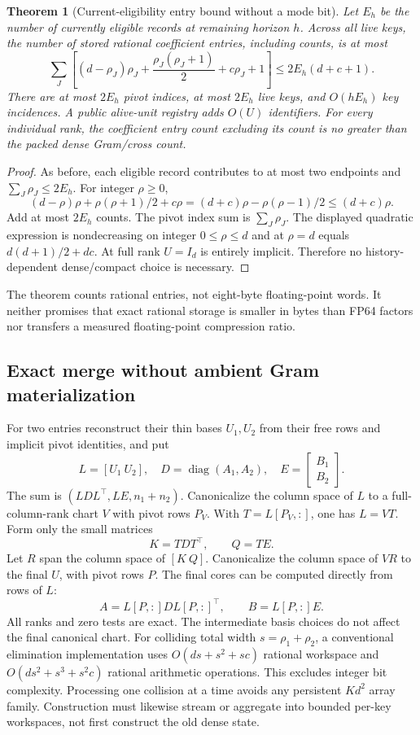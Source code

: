 \documentclass[11pt,a4paper]{article}
\newtheorem{theorem}{Theorem}[section]
\begin{document}
\begin{theorem}[Current-eligibility entry bound without a mode bit]
Let $E_h$ be the number of currently eligible records at remaining horizon
$h$. Across all live keys, the number of stored rational coefficient
entries, including counts, is at most
\[
 \sum_J\left[(d-\rho_J)\rho_J+
       \frac{\rho_J(\rho_J+1)}2+c\rho_J+1\right]
 \le 2E_h(d+c+1).
\]
There are at most $2E_h$ pivot indices, at most $2E_h$ live keys, and
$O(hE_h)$ key incidences. A public alive-unit registry adds $O(U)$
identifiers. For every individual rank, the coefficient entry count
excluding its count is no greater than the packed dense Gram/cross count.
\end{theorem}
\begin{proof}
As before, each eligible record contributes to at most two endpoints and
$\sum_J\rho_J\le2E_h$. For integer $\rho\ge0$,
\[
 (d-\rho)\rho+\rho(\rho+1)/2+c\rho
   =(d+c)\rho-\rho(\rho-1)/2\le(d+c)\rho.
\]
Add at most $2E_h$ counts. The pivot index sum is $\sum_J\rho_J$.
The displayed quadratic expression is nondecreasing on integer
$0\le\rho\le d$ and at $\rho=d$ equals
$d(d+1)/2+dc$. At full rank $U=I_d$ is entirely implicit. Therefore no
history-dependent dense/compact choice is necessary.
\end{proof}

The theorem counts rational entries, not eight-byte floating-point words.
It neither promises that exact rational storage is smaller in bytes than
FP64 factors nor transfers a measured floating-point compression ratio.

\subsection{Exact merge without ambient Gram materialization}
For two entries reconstruct their thin bases $U_1,U_2$ from their free
rows and implicit pivot identities, and put
\[
 L=[U_1\ U_2],\quad
 D=\operatorname{diag}(A_1,A_2),\quad
 E=\begin{bmatrix}B_1\\B_2\end{bmatrix}.
\]
The sum is $(LDL^\top,LE,n_1+n_2)$. Canonicalize the column space of $L$
to a full-column-rank chart $V$ with pivot rows $P_V$. With
$T=L[P_V,:]$, one has $L=VT$. Form only the small matrices
\[
 K=TDT^\top,\qquad Q=TE.
\]
Let $R$ span the column space of $[K\ Q]$. Canonicalize the column space
of $VR$ to the final $U$, with pivot rows $P$. The final cores can be
computed directly from rows of $L$:
\[
 A=L[P,:]D L[P,:]^\top,\qquad B=L[P,:]E.
\]
All ranks and zero tests are exact. The intermediate basis choices do not
affect the final canonical chart. For colliding total width
$s=\rho_1+\rho_2$, a conventional elimination implementation uses
$O(ds+s^2+sc)$ rational workspace and
$O(ds^2+s^3+s^2c)$ rational arithmetic operations. This excludes integer
bit complexity. Processing one collision at a time avoids any persistent
$K d^2$ array family. Construction must likewise stream or aggregate into
bounded per-key workspaces, not first construct the old dense state.
\end{document}
